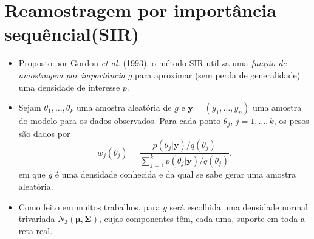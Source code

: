 \documentclass[9pt]{beamer}
\begin{document}
\section{Reamostragem por importância sequêncial(SIR)}
\begin{frame}
\begin{itemize}
\justifying	
\item Proposto por Gordon \textit{et al.} (1993), o método SIR utiliza uma \textit{função de amostragem por importância} $g$ para aproximar (sem perda de generalidade) uma densidade de interesse $p$.

\item Sejam $\theta_1, \ldots, \theta_k$ uma amostra aleatória de $g$ e $\bm{y} = (y_1, \ldots, y_n)$ uma amostra do modelo para os dados observados. Para cada ponto $\theta_j$, $j = 1, \ldots, k$, os pesos são dados por
\begin{equation}\label{eq:sir_wei}
w_j(\theta_j) = \dfrac{p(\theta_j | \bm{y}) / q(\theta_j)}{\sum_{j=1}^{k} p(\theta_j | \bm{y}) / q(\theta_j)}.
\end{equation}
em que $g$  é uma densidade conhecida e da qual se sabe gerar uma amostra aleatória. 
\item Como feito em muitos trabalhos, para $g$ será escolhida uma densidade normal trivariada $N_3(\bm{\mu}, \bm{\Sigma})$, cujas componentes têm, cada uma, suporte em toda a reta real.
\end{itemize}
\end{frame}
\end{document}
